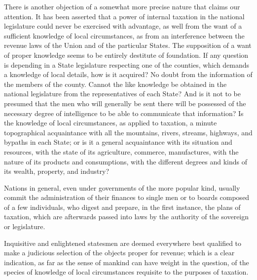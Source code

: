 There is another objection of a somewhat more precise nature that claims our attention. It has been asserted that a power of internal taxation in the national legislature could never be exercised with advantage, as well from the want of a sufficient knowledge of local circumstances, as from an interference between the revenue laws of the Union and of the particular States. The supposition of a want of proper knowledge seems to be entirely destitute of foundation. If any question is depending in a State legislature respecting one of the counties, which demands a knowledge of local details, how is it acquired? No doubt from the information of the members of the county. Cannot the like knowledge be obtained in the national legislature from the representatives of each State? And is it not to be presumed that the men who will generally be sent there will be possessed of the necessary degree of intelligence to be able to communicate that information? Is the knowledge of local circumstances, as applied to taxation, a minute topographical acquaintance with all the mountains, rivers, streams, highways, and bypaths in each State; or is it a general acquaintance with its situation and resources, with the state of its agriculture, commerce, manufactures, with the nature of its products and consumptions, with the different degrees and kinds of its wealth, property, and industry?

Nations in general, even under governments of the more popular kind, usually commit the administration of their finances to single men or to boards composed of a few individuals, who digest and prepare, in the first instance, the plans of taxation, which are afterwards passed into laws by the authority of the sovereign or legislature.

Inquisitive and enlightened statesmen are deemed everywhere best qualified to make a judicious selection of the objects proper for revenue; which is a clear indication, as far as the sense of mankind can have weight in the question, of the species of knowledge of local circumstances requisite to the purposes of taxation.

